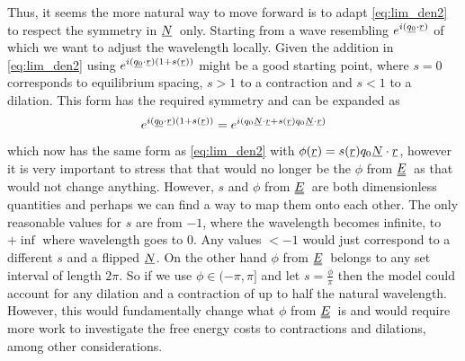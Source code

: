 \documentclass[12pt]{article}
\newcommand{\suf}[2]{\stackunder[0.5pt]{\stackunder[1pt]{\ensuremath{#1}}{\rule{\widthof{\ensuremath{#2}}*\real{0.9}}{.1ex}}}{}}
\newcommand{\duf}[2]{\stackunder[0.5pt]{\stackunder[0.8pt]{\stackunder[1pt]{\ensuremath{#1}}{\rule{\widthof{\ensuremath{#2}}*\real{0.9}}{.1ex}}}{\rule{\widthof{\ensuremath{#2}}*\real{0.9}}{.1ex}}}{}}
\newcommand{\su}[1]{\suf{#1}{#1}}
\newcommand{\du}[1]{\duf{#1}{#1}}
\newcommand{\ssu}[1]{\scriptsize\su{#1}\normalsize}
\newcommand{\NN}{\ensuremath{\su{N}}}
\newcommand{\EE}{\ensuremath{\du{E}}}
\begin{document}
    Thus, it seems the more natural way to move forward is to adapt \cref{eq:lim_den2} to respect the symmetry in \NN\ only.
    Starting from a wave resembling $e^{i(\ssu{q_0}\cdot\ssu{r})}$ of which we want to adjust the wavelength locally.
    Given the addition in \cref{eq:lim_den2} using $e^{i(\ssu{q_0}\cdot\ssu{r})(1+s(\ssu{r}))}$ might be a good starting point, where $s=0$ corresponds to equilibrium spacing, $s>1$ to a contraction and $s<1$ to a dilation.
    This form has the required symmetry and can be expanded as
    \begin{equation}
        e^{i(\ssu{q_0}\cdot\ssu{r})(1+s(\ssu{r}))} = e^{i(q_0\ssu{N}\cdot\ssu{r} + s(\ssu{r})q_0\ssu{N}\cdot\ssu{r})} 
    \end{equation}
    which now has the same form as \cref{eq:lim_den2} with $\phi(\su{r}) = s(\su{r})q_0\su{N}\cdot\su{r}$, however it is very important to stress that that would no longer be the $\phi$ from \EE\ as that would not change anything.
    However, $s$ and $\phi$ from \EE\ are both dimensionless quantities and perhaps we can find a way to map them onto each other.
    The only reasonable values for $s$ are from $-1$, where the wavelength becomes infinite, to $+\inf$ where wavelength goes to 0.
    Any values $<-1$ would just correspond to a different $s$ and a flipped $\su{N}$.
    On the other hand $\phi$ from \EE\ belongs to any set interval of length $2\pi$.
    So if we use $\phi \in (-\pi, \pi]$ and let $s = \frac{\phi}{\pi}$ then the model could account for any dilation and a contraction of up to half the natural wavelength.
    However, this would fundamentally change what $\phi$ from \EE\ is and would require more work to investigate the free energy costs to contractions and dilations, among other considerations.

\newpage
\printbibliography
\end{document}
